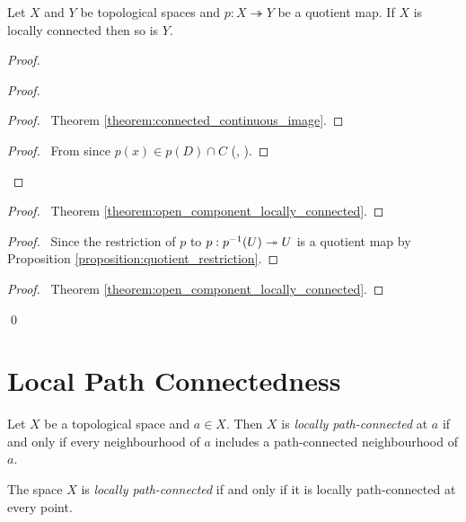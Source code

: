 \begin{proposition}
    Let $X$ and $Y$ be topological spaces and $p : X \twoheadrightarrow Y$ be a quotient map. If $X$ is locally connected then so is $Y$.
\end{proposition}

\begin{proof}
    \pf
    \begin{proof}
        \begin{proof}
            \pf\ Theorem \ref{theorem:connected_continuous_image}.
        \end{proof}
        \begin{proof}
            \pf\ From  since $p(x) \in p(D) \cap C$ (, ).
        \end{proof}
    \end{proof}
    \begin{proof}
        \pf\ Theorem \ref{theorem:open_component_locally_connected}.
    \end{proof}
    \begin{proof}
        \pf\ Since the restriction of $p$ to $p : {p}^{-1}(U) \twoheadrightarrow U$
        is a quotient map by Proposition \ref{proposition:quotient_restriction}.
    \end{proof}
    \qedstep
    \begin{proof}
        \pf\ Theorem \ref{theorem:open_component_locally_connected}.
    \end{proof}
    \qed
\end{proof}

\section{Local Path Connectedness}

\begin{definition}
    Let $X$ be a topological space and $a \in X$. Then $X$ is \emph{locally
    path-connected} at $a$ if and only if every neighbourhood of $a$ includes a
    path-connected neighbourhood of $a$.

    The space $X$ is \emph{locally path-connected} if and only if it is locally
    path-connected at every point.
\end{definition}

